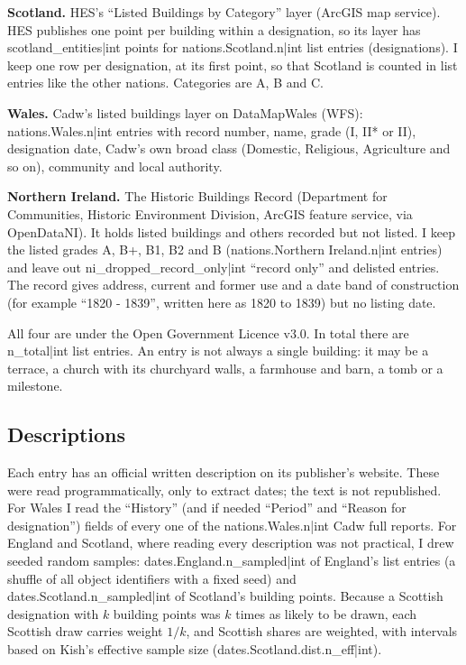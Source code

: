 \documentclass[11pt,a4paper]{article}
\begin{document}
\textbf{Scotland.} HES's ``Listed Buildings by Category'' layer (ArcGIS map service). HES publishes one point per building within a designation, so its layer has {{scotland_entities|int}} points for {{nations.Scotland.n|int}} list entries (designations). I keep one row per designation, at its first point, so that Scotland is counted in list entries like the other nations. Categories are A, B and C.

\textbf{Wales.} Cadw's listed buildings layer on DataMapWales (WFS): {{nations.Wales.n|int}} entries with record number, name, grade (I, II* or II), designation date, Cadw's own broad class (Domestic, Religious, Agriculture and so on), community and local authority.

\textbf{Northern Ireland.} The Historic Buildings Record (Department for Communities, Historic Environment Division, ArcGIS feature service, via OpenDataNI). It holds listed buildings and others recorded but not listed. I keep the listed grades A, B+, B1, B2 and B ({{nations.Northern Ireland.n|int}} entries) and leave out {{ni_dropped_record_only|int}} ``record only'' and delisted entries. The record gives address, current and former use and a date band of construction (for example ``1820 - 1839'', written here as 1820 to 1839) but no listing date.

All four are under the Open Government Licence v3.0. In total there are {{n_total|int}} list entries. An entry is not always a single building: it may be a terrace, a church with its churchyard walls, a farmhouse and barn, a tomb or a milestone.

\subsection{Descriptions}

Each entry has an official written description on its publisher's website. These were read programmatically, only to extract dates; the text is not republished. For Wales I read the ``History'' (and if needed ``Period'' and ``Reason for designation'') fields of every one of the {{nations.Wales.n|int}} Cadw full reports. For England and Scotland, where reading every description was not practical, I drew seeded random samples: {{dates.England.n_sampled|int}} of England's list entries (a shuffle of all object identifiers with a fixed seed) and {{dates.Scotland.n_sampled|int}} of Scotland's building points. Because a Scottish designation with $k$ building points was $k$ times as likely to be drawn, each Scottish draw carries weight $1/k$, and Scottish shares are weighted, with intervals based on Kish's effective sample size ({{dates.Scotland.dist.n_eff|int}}).
\end{document}
